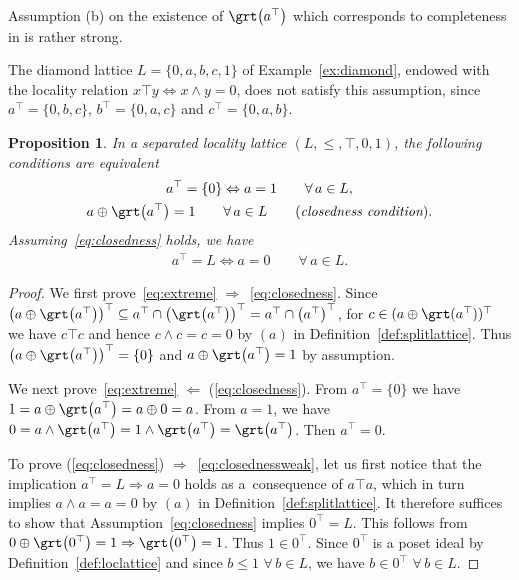 \documentclass[pdftex]{sigma}
\numberwithin{equation}{section}
\newtheorem{Proposition}[Theorem]{Proposition}
\newcommand{\loc}{locality\xspace}
\begin{document}
Assumption (b) on the existence of $\grt\big(a^\top\big)$ which corresponds to completeness in \cite[Definition 2.4]{CM} is rather strong.
	\begin{coex}The diamond lattice	$L=\{0,a,b,c,1\}$ of Example~\ref{ex:diamond}, endowed with the \loc relation $x\top y\Leftrightarrow x\wedge y=0$, does not satisfy this assumption, since $a^\top=\{0,b,c\}$, $b^\top=\{0,a,c\}$ and $c^\top=\{0,a,b\}$.
\end{coex}

\begin{Proposition}	\label{lem:full}
	In a separated locality lattice $(L, \leq,\top, 0,1 )$, the following conditions are equi\-valent
\begin{gather} 	
a^\top=\{0\}\Leftrightarrow a=1 \qquad \forall\, a\in L, \label{eq:extreme}
\\
a\oplus \grt\big(a^\top\big)=1\qquad \forall\, a\in L\qquad (\text{\it closedness condition}).
\label{eq:closedness}
\end{gather}
Assuming~\eqref{eq:closedness} holds, we have
\begin{gather} 	
\label{eq:closednessweak}
a^\top=L\Leftrightarrow a=0\qquad \forall\, a\in L.
\end{gather}
\end{Proposition}

\begin{proof}
We first prove~\eqref{eq:extreme} $\Longrightarrow$~\eqref{eq:closedness}.
Since $\big(a\oplus \grt \big(a^\top\big)\big)^\top \subseteq a^\top \cap \big(\grt \big(a^\top\big)\big)^\top = a^\top \cap \big(a^\top\big)^\top$, for $c\in (a\oplus \grt (a^\top))^\top$ we have $c\top c$ and hence $c\wedge c=c=0$ by $(a)$ in Definition~\ref{def:splitlattice}. Thus $\big(a\oplus \grt \big(a^\top\big)\big)^\top=\{0\}$ and $a\oplus \grt \big(a^\top\big)=1$ by assumption.

We next prove~\eqref{eq:extreme} $\Longleftarrow$ (\ref{eq:closedness}).
From $a^\top = \{0\}$ we have
$1=a\oplus \grt\big(a^\top\big)=a\oplus 0=a$. From $a=1$, we have
$0=a\wedge \grt \big(a^\top\big) =1\wedge \grt\big(a^\top\big)=\grt\big(a^\top\big)$. Then $a^\top=0$.

To prove (\ref{eq:closedness}) $\Longrightarrow$~\eqref{eq:closednessweak}, let us first notice that the implication $a^\top=L\Rightarrow a=0$ holds as a~consequence of $a\top a$, which in turn implies $a\wedge a=a=0$ by $(a)$ in Definition~\ref{def:splitlattice}. It therefore suffices to show that Assumption~\eqref{eq:closedness} implies $0^\top=L$. This follows from $0\oplus\grt\big(0^\top\big)=1\Rightarrow\grt\big(0^\top\big)=1$. Thus $1\in 0^\top$. Since $0^\top$ is a poset ideal by Definition~\ref{def:loclattice} and since $b\leq 1$ $\forall\, b\in L$, we have $b\in 0^\top $ $\forall\, b\in L$.
\end{proof}
\end{document}
